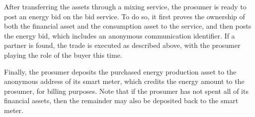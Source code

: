 After transferring the assets through a mixing service, the prosumer is ready to post an energy bid on the bid service.
To do so, it first proves the ownership of both the financial asset and the consumption asset to the service, and then posts the energy bid, which includes an anonymous communication identifier.
If a partner is found, the trade is executed as described above, with the prosumer playing the role of the buyer this time.

Finally, the prosumer deposits the purchased energy production asset to the anonymous address of its smart meter,
which credits the energy amount to the prosumer, for billing purposes.
Note that if the prosumer has not spent all of its financial assets, then the remainder may also be deposited back to the smart meter.





